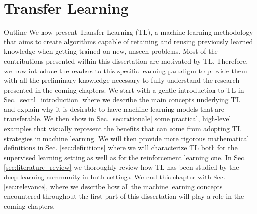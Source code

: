 \chapter{Transfer Learning}
\label{ch:transfer_learning}

\begin{remark}{Outline}
	We now present Transfer Learning (TL), a machine learning methodology that aims to create algorithms capable of retaining and reusing previously learned knowledge when getting trained on new, unseen problems. Most of the contributions presented within this dissertation are motivated by TL. Therefore, we now introduce the readers to this specific learning paradigm to provide them with all the preliminary knowledge necessary to fully understand the research presented in the coming chapters. We start with a gentle introduction to TL in Sec. \ref{sec:tl_introduction} where we describe the main concepts underlying TL and explain why it is desirable to have machine learning models that are transferable. We then show in Sec. \ref{sec:rationale} some practical, high-level examples that visually represent the benefits that can come from adopting TL strategies in machine learning. We will then provide more rigorous mathematical definitions in Sec. \ref{sec:definitions} where we will characterize TL both for the supervised learning setting as well as for the reinforcement learning one. In Sec. \ref{sec:literature_review} we thoroughly review how TL has been studied by the deep learning community in both settings. We end this chapter with Sec. \ref{sec:relevance}, where we describe how all the machine learning concepts encountered throughout the first part of this dissertation will play a role in the coming chapters.  
\end{remark}

